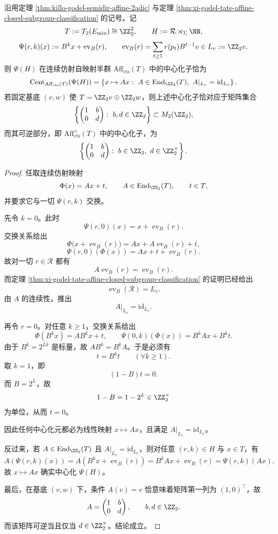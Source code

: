 \begin{theorem}\label{thm:xi-time-part69d-godel-tate-affine-centralizer-complete}
沿用定理 \ref{thm:killo-godel-semidir-affine-2adic} 与定理 \ref{thm:xi-godel-tate-affine-closed-subgroup-classification} 的记号。记
\[
T:=T_2(E_{\min})\cong \ZZ_2^2,
\qquad
H:=\mathcal R\rtimes_\Sigma \NN,
\]
\[
\Psi(r,k)(x):=B^k x+\operatorname{ev}_B(r),
\qquad
\operatorname{ev}_B(r)=\sum_{t\ge 1}r(p_t)B^{t-1}v\in L_v:=\ZZ_2v.
\]
则 \(\Psi(H)\) 在连续仿射自映射半群
\(
\mathrm{Aff}_{\mathrm{cts}}(T)
\)
中的中心化子恰为
\[
\operatorname{Cent}_{\mathrm{Aff}_{\mathrm{cts}}(T)}(\Psi(H))
=
\left\{
x\mapsto Ax:\ A\in \operatorname{End}_{\ZZ_2}(T),\ A|_{L_v}=\mathrm{id}_{L_v}
\right\}.
\]
若固定基底 \((v,w)\) 使
\(
T=\ZZ_2v\oplus \ZZ_2w
\)，则上述中心化子恰对应于矩阵集合
\[
\left\{
\begin{pmatrix}
1 & b\\
0 & d
\end{pmatrix}
:\ b,d\in\ZZ_2
\right\}
\subset M_2(\ZZ_2),
\]
而其可逆部分，即
\(
\mathrm{Aff}_{\mathrm{cts}}^\times(T)
\)
中的中心化子，为
\[
\left\{
\begin{pmatrix}
1 & b\\
0 & d
\end{pmatrix}
:\ b\in\ZZ_2,\ d\in\ZZ_2^\times
\right\}.
\]
\end{theorem}
\begin{proof}
任取连续仿射映射
\[
\Phi(x)=Ax+t,
\qquad
A\in \operatorname{End}_{\ZZ_2}(T),
\qquad
t\in T,
\]
并要求它与一切 \(\Psi(r,k)\) 交换。

先令 \(k=0\)。此时
\[
\Psi(r,0)(x)=x+\operatorname{ev}_B(r).
\]
交换关系给出
\[
\Phi\bigl(x+\operatorname{ev}_B(r)\bigr)
=
Ax+A\operatorname{ev}_B(r)+t,
\]
\[
\Psi(r,0)(\Phi(x))
=
Ax+t+\operatorname{ev}_B(r).
\]
故对一切 \(r\in\mathcal R\) 都有
\[
A\operatorname{ev}_B(r)=\operatorname{ev}_B(r).
\]
而定理 \ref{thm:xi-godel-tate-affine-closed-subgroup-classification} 的证明已经给出
\[
\overline{\operatorname{ev}_B(\mathcal R)}=L_v.
\]
由 \(A\) 的连续性，推出
\[
A|_{L_v}=\mathrm{id}_{L_v}.
\]

再令 \(r=0\)。对任意 \(k\ge 1\)，交换关系给出
\[
\Phi(B^k x)=AB^k x+t,
\qquad
\Psi(0,k)(\Phi(x))=B^kAx+B^k t.
\]
由于 \(B^k=2^{Lk}\) 是标量，故 \(AB^k=B^kA\)。于是必须有
\[
t=B^k t
\qquad (\forall k\ge 1).
\]
取 \(k=1\)，即
\[
(1-B)t=0.
\]
而 \(B=2^L\)，故
\[
1-B=1-2^L\in \ZZ_2^\times
\]
为单位，从而 \(t=0\)。

因此任何中心化元都必为线性映射 \(x\mapsto Ax\)，且满足 \(A|_{L_v}=\mathrm{id}_{L_v}\)。

反过来，若 \(A\in \operatorname{End}_{\ZZ_2}(T)\) 且 \(A|_{L_v}=\mathrm{id}_{L_v}\)，则对任意 \((r,k)\in H\) 与 \(x\in T\)，有
\[
A(\Psi(r,k)(x))
=
A(B^k x+\operatorname{ev}_B(r))
=
B^kAx+\operatorname{ev}_B(r)
=
\Psi(r,k)(Ax),
\]
故 \(x\mapsto Ax\) 确实中心化 \(\Psi(H)\)。

最后，在基底 \((v,w)\) 下，条件 \(A(v)=v\) 恰意味着矩阵第一列为 \((1,0)^\top\)，故
\[
A=
\begin{pmatrix}
1 & b\\
0 & d
\end{pmatrix},
\qquad
b,d\in\ZZ_2.
\]
而该矩阵可逆当且仅当 \(d\in\ZZ_2^\times\)。结论成立。
\end{proof}

